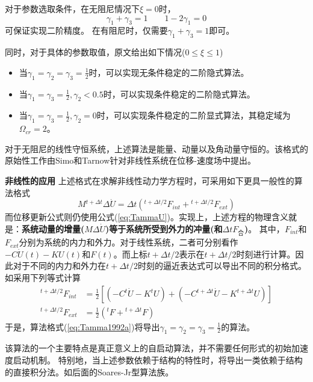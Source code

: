 对于参数选取条件，在无阻尼情况下$\xi=0$时，
\begin{equation}
\gamma_1+\gamma_3=1\qquad 1-2\gamma_1=0
\end{equation}
可保证实现二阶精度。
在有阻尼时，仅需要$\gamma_1+\gamma_3=1$即可。

同时，对于具体的参数取值，原文给出如下情况($0\le\xi\le1$)
\begin{itemize}
\item[\ddag] 当$\gamma_1=\gamma_2=\gamma_3=\frac{1}{2}$时，可以实现无条件稳定的二阶隐式算法\cite{Tamma1990b}。
\item[\ddag] 当$\gamma_1=\gamma_3=\frac{1}{2},\gamma_2<0.5$时，可以实现条件稳定的二阶隐式算法。
\item[\ddag] 当$\gamma_1=\gamma_3=\frac{1}{2},\gamma_2=0$时，可以实现条件稳定的二阶显式算法\cite{Tamma1988f,Tamma1988d,Tamma1989a,Tamma1990c,Tamma1992a}，其稳定域为$\Omega_{cr}=2$。
\end{itemize}

对于无阻尼的线性守恒系统，上述算法是能量、动量以及角动量守恒的。该格式的原始性工作由Simo和Tarnow针对非线性系统在位移-速度场中提出\cite{Simo1992e}。

\textbf{非线性的应用} 上述格式在求解非线性动力学方程时，可采用如下更具一般性的算法格式\cite{Tamma1993a}
\begin{equation}
M{^{t+\Delta t}\!\Delta \dot{U}}=\Delta t({^{t+\Delta t/2}\!F_{int}}+{^{t+\Delta t/2}\!F_{ext}})\label{eq:Tamma1992a}
\end{equation}
而位移更新公式则仍使用公式(\ref{eq:TammaU})。实现上，上述方程的物理含义就是：\textbf{系统动量的增量($M\Delta \dot{U}$)等于系统所受到外力的冲量(和$\Delta tF_{\text{合}}$)}。
其中，$F_{int}$和$F_{ext}$分别为系统的内力和外力。对于线性系统，二者可分别看作$-C\dot{U}(t)-KU(t)$和$F(t)$。而上标$t+\Delta t/2$表示在$t+\Delta t/2$时刻进行计算。因此对于不同的内力和外力在$t+\Delta t/2$时刻的逼近表达式可以导出不同的积分格式。如采用下列等式计算
\begin{align}
{^{t+\Delta t/2}\!F_{int}}&=\frac{1}{2}[(-C{^t\!\dot{U}}-K{^t\!U})+(-C{^{t+\Delta t}\!\dot{U}}-K{^{t+\Delta t}\!U})]\\
{^{t+\Delta t/2}\!F_{ext}}&=\frac{1}{2}({^t\!F}+{^{t+\Delta t}\!F})
\end{align}
于是，算法格式(\ref{eq:Tamma1992a})将导出$\gamma_1=\gamma_2=\gamma_3=\frac{1}{2}$的算法\cite{Tamma1990b}。

该算法的一个主要特点是真正意义上的自启动算法，并不需要任何形式的初始加速度启动机制。
特别地，当上述参数依赖于结构的特性时，将导出一类依赖于结构的直接积分法。如后面的Soares-Jr型算法族。

